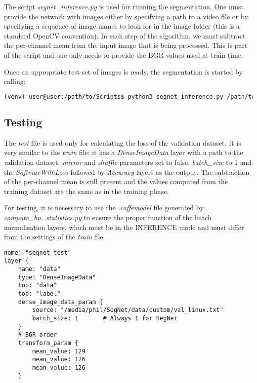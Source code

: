 The script \textit{segnet\_inference.py} is used for running the segmentation. One must provide the network with images either by specifying a path to a video file or by specifying a sequence of image names to look for in the image folder (this is a standard OpenCV convention). In each step of the algorithm, we must subtract the per-channel mean from the input image that is being processed. This is part of the script and one only needs to provide the BGR values used at train time.

Once an appropriate test set of images is ready, the segmentation is started by calling:

\begin{lstlisting}[language=bash]
(venv) user@user:/path/to/Scripts$ python3 segnet_inference.py /path/to/inference.prototxt /path/to/final_weights.caffemodel /path/to/videofile.avi 
\end{lstlisting}

\subsection{Testing}

The \textit{test} file is used only for calculating the loss of the validation dataset. It is very similar to the \textit{train} file: it has a \textit{DenseImageData} layer with a path to the validation dataset, \textit{mirror} and \textit{shuffle} parameters set to false, \textit{batch\_size} to 1 and the \textit{SoftmaxWithLoss} followed by \textit{Accuracy} layers as the output. The subtraction of the per-channel mean is still present and the values computed from the training dataset are the same as in the training phase. 

For testing, it is necessary to use the \textit{.caffemodel} file generated by \textit{compute\_bn\_statistics.py} to ensure the proper function of the batch normalisation layers, which must be in the INFERENCE mode and must differ from the settings of the \textit{train} file.

\begin{lstlisting}[caption={Setting up the input layer of \textit{test.prototxt} \cite{filip_github}},captionpos=b]
name: "segnet_test"
layer {
	name: "data"
	type: "DenseImageData"
	top: "data"
	top: "label"
	dense_image_data_param {
		source: "/media/phil/SegNet/data/custom/val_linux.txt"	
		batch_size: 1		# Always 1 for SegNet
	}
	# BGR order
	transform_param {
		mean_value: 129
		mean_value: 126
		mean_value: 126 
	}  
	
\end{lstlisting}

